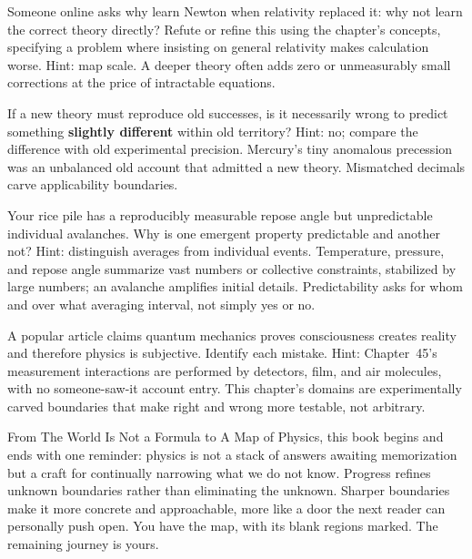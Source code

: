 \begin{puzzles}
\item Someone online asks why learn Newton when relativity replaced it: why not learn the correct theory directly? Refute or refine this using the chapter's concepts, specifying a problem where insisting on general relativity makes calculation worse. Hint: map scale. A deeper theory often adds zero or unmeasurably small corrections at the price of intractable equations.
\item If a new theory must reproduce old successes, is it necessarily wrong to predict something \textbf{slightly different} within old territory? Hint: no; compare the difference with old experimental precision. Mercury's tiny anomalous precession was an unbalanced old account that admitted a new theory. Mismatched decimals carve applicability boundaries.
\item Your rice pile has a reproducibly measurable repose angle but unpredictable individual avalanches. Why is one emergent property predictable and another not? Hint: distinguish averages from individual events. Temperature, pressure, and repose angle summarize vast numbers or collective constraints, stabilized by large numbers; an avalanche amplifies initial details. Predictability asks for whom and over what averaging interval, not simply yes or no.
\item A popular article claims quantum mechanics proves consciousness creates reality and therefore physics is subjective. Identify each mistake. Hint: Chapter~45's measurement interactions are performed by detectors, film, and air molecules, with no someone-saw-it account entry. This chapter's domains are experimentally carved boundaries that make right and wrong more testable, not arbitrary.
\end{puzzles}

From The World Is Not a Formula to A Map of Physics, this book begins and ends with one reminder: physics is not a stack of answers awaiting memorization but a craft for continually narrowing what we do not know. Progress refines unknown boundaries rather than eliminating the unknown. Sharper boundaries make it more concrete and approachable, more like a door the next reader can personally push open. You have the map, with its blank regions marked. The remaining journey is yours.
